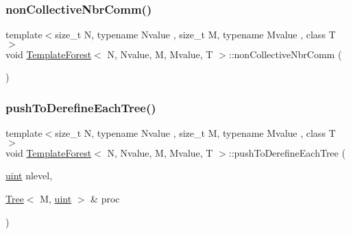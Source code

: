 \subsubsection{\texorpdfstring{non\+Collective\+Nbr\+Comm()}{nonCollectiveNbrComm()}}
{\footnotesize\ttfamily template$<$size\+\_\+t N, typename Nvalue , size\+\_\+t M, typename Mvalue , class T $>$ \\
void \mbox{\hyperlink{classTemplateForest}{Template\+Forest}}$<$ N, Nvalue, M, Mvalue, T $>$\+::non\+Collective\+Nbr\+Comm (\begin{DoxyParamCaption}{ }\end{DoxyParamCaption})}

\mbox{\label{classTemplateForest_a2d6eaf33be1cc4cc461c269e1d2c88dd}} 
\subsubsection{\texorpdfstring{push\+To\+Derefine\+Each\+Tree()}{pushToDerefineEachTree()}}
{\footnotesize\ttfamily template$<$size\+\_\+t N, typename Nvalue , size\+\_\+t M, typename Mvalue , class T $>$ \\
void \mbox{\hyperlink{classTemplateForest}{Template\+Forest}}$<$ N, Nvalue, M, Mvalue, T $>$\+::push\+To\+Derefine\+Each\+Tree (\begin{DoxyParamCaption}\item[{\mbox{\hyperlink{definitions_8h_a69aa29b598b851b0640aa225a9e5d61d}{uint}}}]{nlevel,  }\item[{\mbox{\hyperlink{classTree}{Tree}}$<$ M, \mbox{\hyperlink{definitions_8h_a69aa29b598b851b0640aa225a9e5d61d}{uint}} $>$ \&}]{proc }\end{DoxyParamCaption})}

\mbox{\label{classTemplateForest_a92e50d5845a52e4bcf19d54b56e1ccf9}} 
